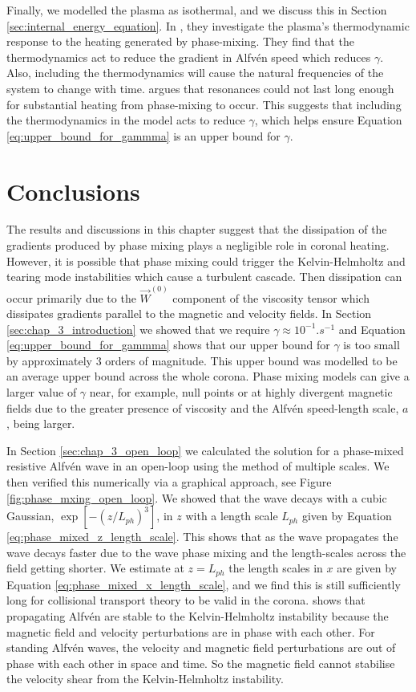 Finally, we modelled the plasma as isothermal, and we discuss this in Section \ref{sec:internal_energy_equation}. In \citet{Cargill2016}, they investigate the plasma's thermodynamic response to the heating generated by phase-mixing. They find that the thermodynamics act to reduce the gradient in Alfv\'en speed which reduces $\gamma$. Also, including the thermodynamics will cause the natural frequencies of the system to change with time. \citet{Arregui2015} argues that resonances could not last long enough for substantial heating from phase-mixing to occur. This suggests that including the thermodynamics in the model acts to reduce $\gamma$, which helps ensure Equation \eqref{eq:upper_bound_for_gammma} is an upper bound for $\gamma$.

\section{Conclusions}

The results and discussions in this chapter suggest that the dissipation of the gradients produced by phase mixing plays a negligible role in coronal heating. However, it is possible that phase mixing could trigger the Kelvin-Helmholtz and tearing mode instabilities which cause a turbulent cascade. Then dissipation can occur primarily due to the $\vec{W}^{(0)}$ component of the viscosity tensor which dissipates gradients parallel to the magnetic and velocity fields. In Section \ref{sec:chap_3_introduction} we showed that we require $\gamma\approx10^{-1}\si{.s^{-1}}$ and Equation \eqref{eq:upper_bound_for_gammma} shows that our upper bound for $\gamma$ is too small by approximately 3 orders of magnitude. This upper bound was modelled to be an average upper bound across the whole corona. Phase mixing models can give a larger value of $\gamma$ near, for example, null points or at highly divergent magnetic fields due to the greater presence of viscosity and the Alfv\'en speed-length scale, $a$, being larger.

In Section \ref{sec:chap_3_open_loop} we calculated the solution for a phase-mixed resistive Alfv\'en wave in an open-loop using the method of multiple scales. We then verified this numerically via a graphical approach, see Figure \ref{fig:phase_mxing_open_loop}. We showed that the wave decays with a cubic Gaussian, $\exp[-(z/L_{ph})^3]$, in $z$ with a length scale $L_{ph}$ given by Equation \eqref{eq:phase_mixed_z_length_scale}. This shows that as the wave propagates the wave decays faster due to the wave phase mixing and the length-scales across the field getting shorter. We estimate at $z=L_{ph}$ the length scales in $x$ are given by Equation \eqref{eq:phase_mixed_x_length_scale}, and we find this is still sufficiently long for collisional transport theory to be valid in the corona. \citet{Heyvaerts1983} shows that propagating Alfv\'en are stable to the Kelvin-Helmholtz instability because the magnetic field and velocity perturbations are in phase with each other. For standing Alfv\'en waves, the velocity and magnetic field perturbations are out of phase with each other in space and time. So the magnetic field cannot stabilise the velocity shear from the Kelvin-Helmholtz instability.

